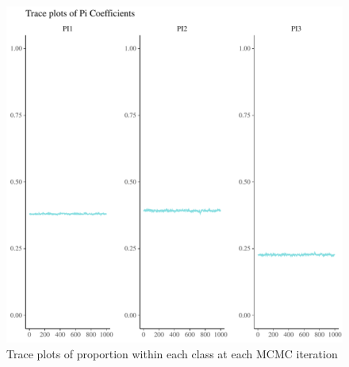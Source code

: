 \documentclass{article}
\begin{document}
\begin{figure}
	\label{fig:sim1_pi_trace}
	\caption{Trace plots of proportion within each class at each MCMC iteration}
	\centering
	\includegraphics[width = 1\textwidth]{pi_trace.pdf}
\end{figure}
\end{document}
